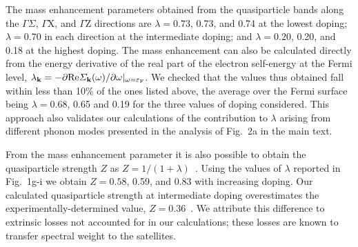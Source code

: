 \documentclass[12pt]{nature-mod}
\def\ve{\varepsilon}
\begin{document}
The mass enhancement parameters obtained from the quasiparticle bands along the $\Gamma\Sigma$,
$\Gamma$X, and $\Gamma$Z directions are $\lambda = 0.73$, 0.73, and 0.74 at the lowest doping; 
$\lambda=0.70$ in each direction at the intermediate doping; and $\lambda =0.20$, 0.20, and 0.18 
at the highest doping. The mass enhancement can also be calculated directly from the energy derivative 
of the real part of the electron self-energy at the Fermi level, $\lambda_{\bf k}=-\partial{\rm Re}
\varSigma_{\bf k}(\omega)/\partial\omega|_{\omega=\ve_{\rm F}}$\cite{Grimvall}. We checked that the values 
thus obtained fall within less than 10\% of the ones listed above, the average over the Fermi surface 
being \mbox{$\lambda=0.68$,} 0.65 and 0.19 for the three values of doping considered. This approach also 
validates our calculations of the contribution to $\lambda$ arising from different phonon modes presented 
in the analysis of Fig.~2a in the main text.

From the mass enhancement parameter it is also possible to obtain the quasiparticle strength $Z$ as 
$Z=1/(1+\lambda)$~\cite{Grimvall}. Using the values of $\lambda$ reported in Fig.~1g-i we obtain 
$Z=0.58$, 0.59, and 0.83 with increasing doping. Our calculated quasiparticle strength at intermediate 
doping overestimates the experimentally-determined value, $Z=0.36$~\cite{Moser2013}. We attribute this 
difference to extrinsic losses not accounted for in our calculations; these losses are known to transfer 
spectral weight to the satellites\cite{Hedin1985, Aryasetiawan1996, Kas2016}.
\end{document}
